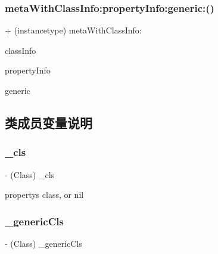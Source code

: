 \subsubsection{\texorpdfstring{meta\+With\+Class\+Info\+:property\+Info\+:generic\+:()}{metaWithClassInfo:propertyInfo:generic:()}}
{\footnotesize\ttfamily + (instancetype) meta\+With\+Class\+Info\+: \begin{DoxyParamCaption}\item[{(\hyperlink{interface_m_a_r_class_info}{M\+A\+R\+Class\+Info} $\ast$)}]{class\+Info }\item[{propertyInfo:(\hyperlink{interface_m_a_r_class_property_info}{M\+A\+R\+Class\+Property\+Info} $\ast$)}]{property\+Info }\item[{generic:(Class)}]{generic }\end{DoxyParamCaption}\hspace{0.3cm}{\ttfamily [implementation]}}



\subsection{类成员变量说明}
\mbox{\label{interface___m_a_r_model_property_meta_a6d3692d93d3afa41bf9e2a41809e1f02}} 
\subsubsection{\texorpdfstring{\+\_\+cls}{\_cls}}
{\footnotesize\ttfamily -\/ (Class) \+\_\+cls\hspace{0.3cm}{\ttfamily [protected]}}



property\textquotesingle{}s class, or nil 

\mbox{\label{interface___m_a_r_model_property_meta_ad5b4b19b5c5cb6f90c7cbe004c503260}} 
\subsubsection{\texorpdfstring{\+\_\+generic\+Cls}{\_genericCls}}
{\footnotesize\ttfamily -\/ (Class) \+\_\+generic\+Cls\hspace{0.3cm}{\ttfamily [protected]}}



